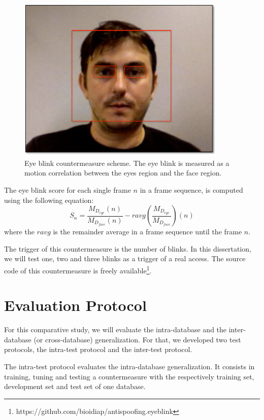 \begin{figure}[!btb]
\begin{center}
\includegraphics [width=10cm] {images/eye_blink.pdf}
\caption[Eye blink countermeasure scheme]{Eye blink countermeasure scheme. The eye blink is measured as a motion correlation between the eyes region and the face region.}
\label{fig:eye_blink}
\end{center}
\end{figure}


The eye blink score for each single frame $n$ in a frame sequence, is computed using the following equation:
\begin{equation}
S_n=   \frac{M_{D_{eye}}(n)}{M_{D_{face}}(n)} - ravg(\frac{M_{D_{eye}}}{M_{D_{face}}})(n)
\label{eq:score_blink}
\end{equation}
where the $ravg$ is the remainder average in a frame sequence until the frame $n$.

The trigger of this countermeasure is the number of blinks. In this dissertation, we will test one, two and three blinks as a trigger of a real access. The source code of this countermeasure is freely available\footnote{https://github.com/bioidiap/antispoofing.eyeblink}.


\section{Evaluation Protocol}
\label{sec:Evaluation_Protocol}

For this comparative study, we will evaluate the intra-database and the inter-database (or cross-database) generalization. For that, we developed two test protocols, the intra-test protocol and the inter-test protocol. 

The intra-test protocol evaluates the intra-database generalization. It consists in training, tuning and testing a countermeasure with the respectively training set, development set and test set of one database.

